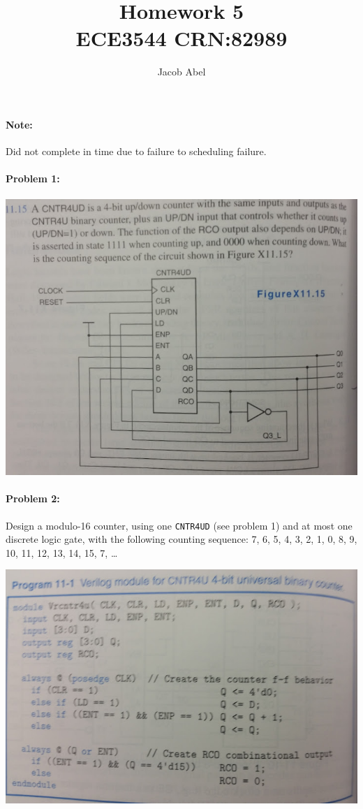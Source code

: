 \documentclass[12pt,letterpaper,titlepage]{article}
\author{Jacob Abel}
\title{	Homework 5
	\\\large ECE3544 CRN:82989
}
\begin{document}
\maketitle
\begin{raggedright}
\paragraph{Note: } Did not complete in time due to failure to scheduling failure.
 
\paragraph{Problem 1: }
\begin{center}
\includegraphics[width=\textwidth]{p1}
\end{center}

\paragraph{Problem 2: }
Design a modulo-16 counter, using one \texttt{CNTR4UD} (see problem 1) and at most one discrete logic gate, with the following counting sequence: 7, 6, 5, 4, 3, 2, 1, 0, 8, 9, 10, 11, 12, 13, 14, 15, 7, \ldots
\begin{center}
\includegraphics[width=\textwidth]{p2}
\end{center}


\end{raggedright}
\end{document}
